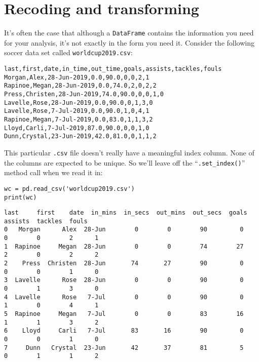 
\chapter{Recoding and transforming}


It's often the case that although a \texttt{DataFrame} contains the information
you need for your analysis, it's not exactly in the form you need it. Consider
the following soccer data set called \texttt{worldcup2019.csv}:

\begin{Verbatim}[fontsize=\small,samepage=true,frame=lines,framesep=3mm]
last,first,date,in_time,out_time,goals,assists,tackles,fouls
Morgan,Alex,28-Jun-2019,0.0,90.0,0,0,2,1
Rapinoe,Megan,28-Jun-2019,0.0,74.0,2,0,2,2
Press,Christen,28-Jun-2019,74.0,90.0,0,0,1,0
Lavelle,Rose,28-Jun-2019,0.0,90.0,0,1,3,0
Lavelle,Rose,7-Jul-2019,0.0,90.0,1,0,4,1
Rapinoe,Megan,7-Jul-2019,0.0,83.0,1,1,3,2
Lloyd,Carli,7-Jul-2019,87.0,90.0,0,0,1,0
Dunn,Crystal,23-Jun-2019,42.0,81.0,0,1,1,2
\end{Verbatim}


This particular \texttt{.csv} file doesn't really have a meaningful index
column. None of the columns are expected to be unique. So we'll leave off the
``\texttt{.set\_index()}'' method call when we read it in:

\begin{samepage}
\begin{Verbatim}[fontsize=\scriptsize,samepage=true,frame=single,framesep=3mm]
wc = pd.read_csv('worldcup2019.csv')
print(wc)
\end{Verbatim}
\vspace{-.2in}

\begin{Verbatim}[fontsize=\scriptsize,samepage=true,frame=leftline,framesep=5mm,framerule=1mm]
      last     first    date  in_mins  in_secs  out_mins  out_secs  goals  assists  tackles  fouls
0   Morgan      Alex  28-Jun        0        0        90         0      0        0        2      1
1  Rapinoe     Megan  28-Jun        0        0        74        27      2        0        2      2
2    Press  Christen  28-Jun       74       27        90         0      0        0        1      0
3  Lavelle      Rose  28-Jun        0        0        90         0      0        1        3      0
4  Lavelle      Rose   7-Jul        0        0        90         0      1        0        4      1
5  Rapinoe     Megan   7-Jul        0        0        83        16      1        1        3      2
6    Lloyd     Carli   7-Jul       83       16        90         0      0        0        1      0
7     Dunn   Crystal  23-Jun       42       37        81         5      0        1        1      2
\end{Verbatim}
\end{samepage}

